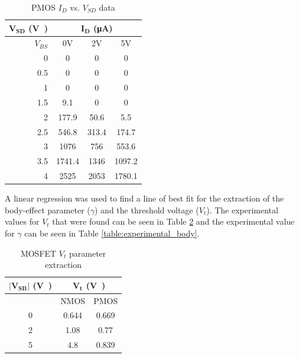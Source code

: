 \documentclass[11pt]{article}
\begin{document}
	\begin{table}[H]
		\centering
		\caption{PMOS \(I_D\) vs. \(V_{SD}\) data}
		\label{table:pmos_vt}
		\begin{tabular}{|r||c|c|c|}
			\hline
			{\(\mathbf{V_{SD}}\) (\si\volt)} & \multicolumn{3}{|c|}{\(\mathbf{I_D}\) (\si{\micro\ampere})}\\
			\hline
			\(V_{BS}\) & 0\si{\volt} & 2\si{\volt} & 5\si{\volt}\\
			\hline
			0 & 0 & 0 & 0\\
			0.5 & 0 & 0 & 0\\
			1 & 0 & 0 & 0\\
			1.5 & 9.1 & 0 & 0\\
			2 & 177.9 & 50.6 & 5.5\\
			2.5 & 546.8 & 313.4 & 174.7\\
			3 & 1076 & 756 & 553.6\\
			3.5 & 1741.4 & 1346 & 1097.2\\
			4 & 2525 & 2053 & 1780.1\\
			\hline
		\end{tabular}
	\end{table}
	
	A linear regression was used to find a line of best fit for the extraction
	of the body-effect parameter (\(\gamma\)) and the threshold voltage (\(V_t\)).
	The experimental values for \(V_t\) that were found can be seen in Table
	\ref{table:experimental_vt} and the experimental value for \(\gamma\) can
	be seen in Table \ref{table:experimental_body}.

	\begin{table}[H]
		\centering
		\caption{MOSFET \(V_t\) parameter extraction}
		\label{table:experimental_vt}
		\begin{tabular}{|c|c|c|}
			\hline
			\(\mathbf{|V_{SB}|}\) (\si\volt) & \multicolumn{2}{|c|}{\(\mathbf{V_t}\) (\si\volt)}\\
			\hline
			& NMOS & PMOS\\
			\hline
			0 & 0.644 & 0.669\\
			2 & 1.08 & 0.77\\
			5 & 4.8 & 0.839\\
			\hline
		\end{tabular}
	\end{table}
\end{document}
